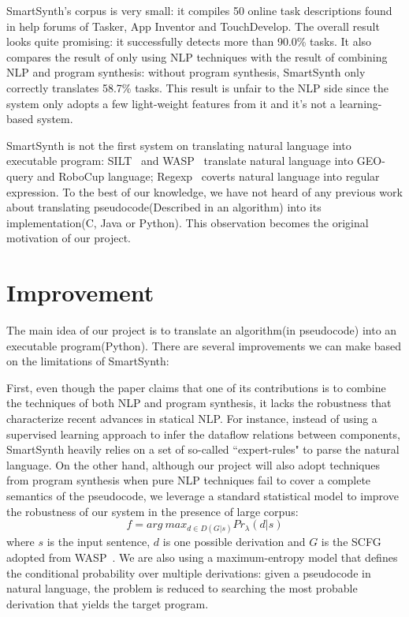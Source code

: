 \documentclass[10pt]{article}
\begin{document}
SmartSynth's corpus is very small: it compiles 50 online task descriptions found in
help forums of Tasker, App Inventor and TouchDevelop. The overall result
looks quite promising: it successfully detects more than 90.0\% tasks. It also compares 
the result of only using NLP techniques with the result of combining NLP and program 
synthesis: without program synthesis, SmartSynth only correctly translates 58.7\% tasks. 
This result is unfair to the NLP side since the system only adopts a few light-weight 
features from it and it's not a learning-based system.

SmartSynth is not the first system on translating natural language into executable
program: SILT~\cite{silt} and WASP~\citep{wasp} translate natural language into GEO-query 
and RoboCup language; Regexp~\cite{reg} coverts natural language into regular expression.
To the best of our knowledge, we have not heard of any previous work about translating
 pseudocode(Described in an algorithm) into its implementation(C, Java or Python). 
This observation becomes the original motivation of our project.
\section{Improvement}\label{sec:alg}
The main idea of our project is to translate an algorithm(in pseudocode) into an 
executable program(Python). There are several improvements we can make based on the 
limitations of SmartSynth:

First, even though the paper claims that one of its contributions is to combine the
techniques of both NLP and program synthesis, it lacks the robustness that characterize
recent advances in statical NLP. For instance, instead of using a supervised learning 
approach to infer the dataflow relations between components, SmartSynth heavily 
relies on a set of so-called ``expert-rules" to parse the natural language. On the 
other hand, although our project will also adopt techniques from program synthesis when 
pure NLP techniques fail to cover a complete semantics of the pseudocode, we 
leverage a standard statistical model to improve the 
robustness of our system in the presence of large corpus: 
\[
f = arg \ max_{d\in D(G|s)} Pr_{\lambda}(d|s)
\]
where $s$ is the input sentence, $d$ is one possible derivation and $G$ is the 
SCFG adopted from WASP~\cite{wasp}.
We are also using a maximum-entropy model that defines the conditional probability 
over multiple derivations: given a pseudocode in natural language, the problem is reduced to searching the most probable derivation that yields the target program.
\end{document}

